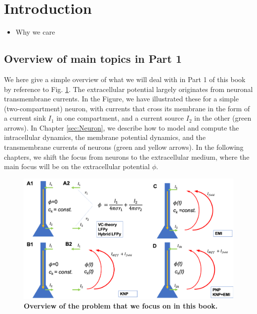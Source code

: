 \section{Introduction} 
\label{sec:Intro}

\begin{itemize}
\item Why we care \citep{Buzsaki2012,Pettersen2012,Einevoll2013,Einevoll2013a,Einevoll2019}
\end{itemize}


\subsection{Overview of main topics in Part 1}


We here give a simple overview of what we will deal with in Part 1 of this book by reference to Fig. \ref{Intro:fig:Knallfigur}. The extracellular potential largely originates from neuronal transmembrane currents. In the Figure, we have illustrated these for a simple (two-compartment) neuron, with currents that cross its membrane in the form of a current sink $I_1$ in one compartment, and a current source $I_2$ in the other (green arrows). In Chapter \ref{sec:Neuron}, we describe how to model and compute the intracellular dynamics, the membrane potential dynamics, and the transmembrane currents of neurons (green and yellow arrows). In the following chapters, we shift the focus from neurons to the extracellular medium, where the main focus will be on the extracellular potential $\phi$.

\begin{figure}[!ht]
\begin{center}
\includegraphics[width=1\textwidth]{Figures/Skjemaoversikt.png}
\end{center}
\caption{\textbf{Overview of the problem that we focus on in this book.} 
}
\label{Intro:fig:Knallfigur}
\end{figure}

